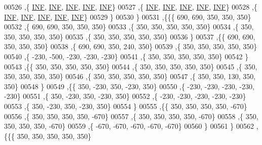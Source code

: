 \begin{DoxyCode}
00526    ,\{   \mbox{\hyperlink{1_88_84__epars_8h_a12c2040f25d8e3a7b9e1c2024c618cb6}{INF}},   \mbox{\hyperlink{1_88_84__epars_8h_a12c2040f25d8e3a7b9e1c2024c618cb6}{INF}},   \mbox{\hyperlink{1_88_84__epars_8h_a12c2040f25d8e3a7b9e1c2024c618cb6}{INF}},   \mbox{\hyperlink{1_88_84__epars_8h_a12c2040f25d8e3a7b9e1c2024c618cb6}{INF}},   \mbox{\hyperlink{1_88_84__epars_8h_a12c2040f25d8e3a7b9e1c2024c618cb6}{INF}}\}
00527    ,\{   \mbox{\hyperlink{1_88_84__epars_8h_a12c2040f25d8e3a7b9e1c2024c618cb6}{INF}},   \mbox{\hyperlink{1_88_84__epars_8h_a12c2040f25d8e3a7b9e1c2024c618cb6}{INF}},   \mbox{\hyperlink{1_88_84__epars_8h_a12c2040f25d8e3a7b9e1c2024c618cb6}{INF}},   \mbox{\hyperlink{1_88_84__epars_8h_a12c2040f25d8e3a7b9e1c2024c618cb6}{INF}},   \mbox{\hyperlink{1_88_84__epars_8h_a12c2040f25d8e3a7b9e1c2024c618cb6}{INF}}\}
00528    ,\{   \mbox{\hyperlink{1_88_84__epars_8h_a12c2040f25d8e3a7b9e1c2024c618cb6}{INF}},   \mbox{\hyperlink{1_88_84__epars_8h_a12c2040f25d8e3a7b9e1c2024c618cb6}{INF}},   \mbox{\hyperlink{1_88_84__epars_8h_a12c2040f25d8e3a7b9e1c2024c618cb6}{INF}},   \mbox{\hyperlink{1_88_84__epars_8h_a12c2040f25d8e3a7b9e1c2024c618cb6}{INF}},   \mbox{\hyperlink{1_88_84__epars_8h_a12c2040f25d8e3a7b9e1c2024c618cb6}{INF}}\}
00529    \}
00530   \}
00531  ,\{\{\{   690,   690,   350,   350,   350\}
00532    ,\{   690,   690,   350,   350,   350\}
00533    ,\{   350,   350,   350,   350,   350\}
00534    ,\{   350,   350,   350,   350,   350\}
00535    ,\{   350,   350,   350,   350,   350\}
00536    \}
00537   ,\{\{   690,   690,   350,   350,   350\}
00538    ,\{   690,   690,   350,   240,   350\}
00539    ,\{   350,   350,   350,   350,   350\}
00540    ,\{  -230,  -500,  -230,  -230,  -230\}
00541    ,\{   350,   350,   350,   350,   350\}
00542    \}
00543   ,\{\{   350,   350,   350,   350,   350\}
00544    ,\{   350,   350,   350,   350,   350\}
00545    ,\{   350,   350,   350,   350,   350\}
00546    ,\{   350,   350,   350,   350,   350\}
00547    ,\{   350,   350,   130,   350,   350\}
00548    \}
00549   ,\{\{   350,  -230,   350,  -230,   350\}
00550    ,\{  -230,  -230,  -230,  -230,  -230\}
00551    ,\{   350,  -230,   350,  -230,   350\}
00552    ,\{  -230,  -230,  -230,  -230,  -230\}
00553    ,\{   350,  -230,   350,  -230,   350\}
00554    \}
00555   ,\{\{   350,   350,   350,   350,  -670\}
00556    ,\{   350,   350,   350,   350,  -670\}
00557    ,\{   350,   350,   350,   350,  -670\}
00558    ,\{   350,   350,   350,   350,  -670\}
00559    ,\{  -670,  -670,  -670,  -670,  -670\}
00560    \}
00561   \}
00562  ,\{\{\{   350,   350,   350,   350,   350\}

\end{DoxyCode}
